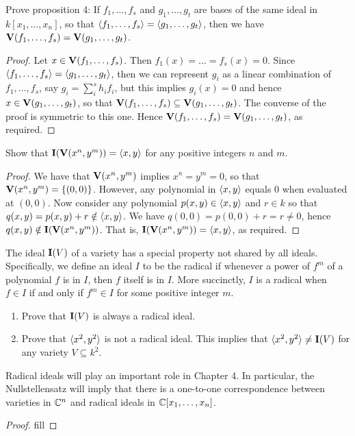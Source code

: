 \begin{exercise}{4}
Prove proposition 4: If $f_1,\dots,f_s$ and $g_1,\dots,g_t$ are bases of the same ideal in $k[x_1,\dots,x_n]$, so that $\langle f_1,\dots,f_s\rangle=\langle g_1,\dots,g_t\rangle$, then we have $\mathbf{V}(f_1,\dots,f_s)=\mathbf{V}(g_1,\dots,g_t)$.
\end{exercise}
\begin{proof}
Let $x\in \mathbf{V}(f_1,\dots,f_s)$. Then $f_1(x)=\dots=f_s(x)=0$. Since $\langle f_1,\dots,f_s\rangle=\langle g_1,\dots,g_t\rangle$, then we can represent $g_i$ as a linear combination of $f_1,\dots,f_s$, say $g_i=\sum_i^sh_if_i$, but this implies $g_i(x)=0$ and hence $x\in\mathbf{V}(g_1,\dots,g_t)$, so that $\mathbf{V}(f_1,\dots,f_s)\subseteq\mathbf{V}(g_1,\dots,g_t)$. The converse of the proof is symmetric to this one. Hence $\mathbf{V}(f_1,\dots,f_s)=\mathbf{V}(g_1,\dots,g_t)$, as required.
\end{proof}

\begin{exercise}{7}
Show that $\mathbf{I}(\mathbf{V}(x^n,y^m))=\langle x,y\rangle$ for any positive integers $n$ and $m$.
\end{exercise}
\begin{proof}
We have that $\mathbf{V}(x^n,y^m)$ implies $x^n=y^m=0$, so that $\mathbf{V}(x^n,y^m)=\{(0,0)\}$. However, any polynomial in $\langle x,y\rangle$ equals 0 when evaluated at $(0,0)$. Now consider any polynomial $p(x,y)\in\langle x,y\rangle$ and $r\in k$ so that $q(x,y)=p(x,y)+r\notin\langle x,y\rangle$. We have $q(0,0)=p(0,0)+r=r\neq 0$, hence $q(x,y)\notin\mathbf{I}(\mathbf{V}(x^n,y^m))$. That is, $\mathbf{I}(\mathbf{V}(x^n,y^m))=\langle x,y\rangle$, as required.
\end{proof}

\begin{exercise}{8}
The ideal $\mathbf{I}(V)$ of a variety has a special property not shared by all ideals. Specifically, we define an ideal $I$ to be the radical if whenever a power of $f^m$ of a polynomial $f$ is in $I$, then $f$ itself is in $I$. More succinctly, $I$ is a radical when $f\in I$ if and only if $f^m\in I$ for some positive integer $m$.
\begin{enumerate}
    \item Prove that $\mathbf{I}(V)$ is always a radical ideal.
    \item Prove that $\langle x^2,y^2\rangle$ is not a radical ideal. This implies that $\langle x^2,y^2\rangle\neq \mathbf{I}(V)$ for any variety $V\subseteq k^2$.
\end{enumerate}
Radical ideals will play an important role in Chapter 4. In particular, the Nullstellensatz will imply that there is a one-to-one correspondence between varieties in $\mathbb{C}^n$ and radical ideals in $\mathbb{C}[x_1,\dots,x_n]$.
\end{exercise}
\begin{proof}
fill
\end{proof}

